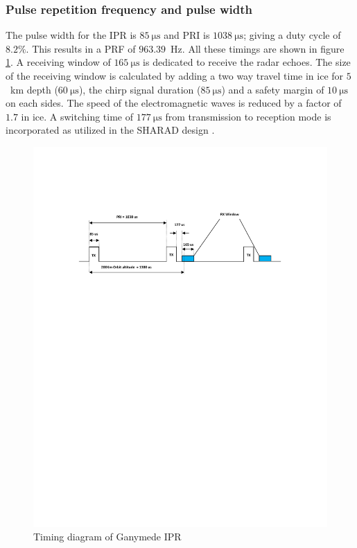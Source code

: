 \subsubsection{Pulse repetition frequency and pulse width}
The pulse width for the \ac{IPR} is $85 \mathrm{~\mu s} $ and \ac{PRI} is $1038 \mathrm{~\mu s}$; giving a duty cycle of $8.2\% $. This results in a \ac{PRF} of $963.39$~Hz. All these timings are shown in figure \ref{fig:PRI}. A receiving window of $165 \mathrm{~\mu s}$ is dedicated to receive the radar echoes. The size of the receiving window is calculated by adding a two way travel time in ice for $5$~km depth ($60 \mathrm{~\mu s}$), the chirp signal duration ($85\mathrm{~\mu s}$) and  a safety margin of $10 \mathrm{~\mu s}$ on each sides. The speed of the electromagnetic waves is reduced by a factor of $1.7$ in ice. A switching time of $177 \mathrm{~\mu s}$ from transmission to reception mode is incorporated as utilized in the \ac{SHARAD} design \cite{SHARAD}.
%
\begin{figure}[bht]
\centering
\includegraphics[scale=1]{Figures/PRI.pdf}
\caption{Timing diagram of Ganymede \ac{IPR}} 
\label{fig:PRI}
\end{figure}
%
